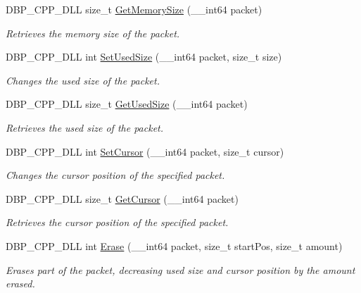\begin{DoxyCompactItemize}
DBP\_\-CPP\_\-DLL size\_\-t \hyperlink{namespacemn_ad3e77a7a0d7ce4a2f1b33ab61ac268e5}{GetMemorySize} (\_\-\_\-int64 packet)
\begin{DoxyCompactList}\small\item\em Retrieves the memory size of the packet. \item\end{DoxyCompactList}\item 
DBP\_\-CPP\_\-DLL int \hyperlink{namespacemn_ad552a2a89165470686778f966d65bdc9}{SetUsedSize} (\_\-\_\-int64 packet, size\_\-t size)
\begin{DoxyCompactList}\small\item\em Changes the used size of the packet. \item\end{DoxyCompactList}\item 
DBP\_\-CPP\_\-DLL size\_\-t \hyperlink{namespacemn_aea5a6460be64a0d83240fd2c234cd4ed}{GetUsedSize} (\_\-\_\-int64 packet)
\begin{DoxyCompactList}\small\item\em Retrieves the used size of the packet. \item\end{DoxyCompactList}\item 
DBP\_\-CPP\_\-DLL int \hyperlink{namespacemn_a46a0362cea289b80f8ae8bffda655fd8}{SetCursor} (\_\-\_\-int64 packet, size\_\-t cursor)
\begin{DoxyCompactList}\small\item\em Changes the cursor position of the specified packet. \item\end{DoxyCompactList}\item 
DBP\_\-CPP\_\-DLL size\_\-t \hyperlink{namespacemn_a5e5f17a4f67ee287b3cb90295c5177d0}{GetCursor} (\_\-\_\-int64 packet)
\begin{DoxyCompactList}\small\item\em Retrieves the cursor position of the specified packet. \item\end{DoxyCompactList}\item 
DBP\_\-CPP\_\-DLL int \hyperlink{namespacemn_af0bc7781b53d5d452fa74eca83c50482}{Erase} (\_\-\_\-int64 packet, size\_\-t startPos, size\_\-t amount)
\begin{DoxyCompactList}\small\item\em Erases part of the packet, decreasing used size and cursor position by the amount erased. \item\end{DoxyCompactList}\item 

\end{DoxyCompactItemize}
